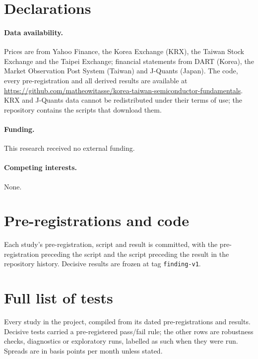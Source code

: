 \documentclass[12pt,a4paper]{article}
\begin{document}
\section*{Declarations}

\paragraph{Data availability.} Prices are from Yahoo Finance, the Korea Exchange (KRX), the Taiwan Stock Exchange and
the Taipei Exchange; financial statements from DART (Korea), the Market Observation Post System (Taiwan) and J-Quants
(Japan). The code, every pre-registration and all derived results are available at
\url{https://github.com/matheowitasse/korea-taiwan-semiconductor-fundamentals}. KRX and J-Quants data cannot be redistributed under their terms of use; the repository contains the scripts
that download them.

\paragraph{Funding.} This research received no external funding.

\paragraph{Competing interests.} None.




\appendix
\section{Pre-registrations and code}
Each study's pre-registration, script and result is committed, with the pre-registration preceding the script and the
script preceding the result in the repository history. Decisive results are frozen at tag \texttt{finding-v1}.

\clearpage
\section{Full list of tests}\label{app:tests}

Every study in the project, compiled from its dated pre-registrations and results. Decisive tests carried a pre-registered pass/fail
rule; the other rows are robustness checks, diagnostics or exploratory runs, labelled as such when they were run.
Spreads are in basis points per month unless stated.
\end{document}
